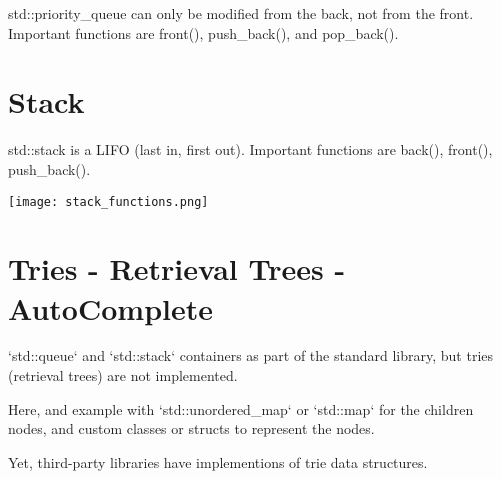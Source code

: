 \documentclass[openany]{report}
\begin{document}
std::priority\_queue can only be modified from the back, not from the front. Important functions are front(), push\_back(), 
and pop\_back().

\section{Stack}

std::stack is a LIFO (last in, first out). Important functions are back(), front(), push\_back().

\begin{center}
    \texttt{[image: stack\_functions.png]}
\end{center}

\section{Tries - Retrieval Trees - AutoComplete}

`std::queue` and `std::stack` containers as part of the standard library, but tries (retrieval trees) are not implemented. 

Here, and example with `std::unordered\_map` or `std::map` for the children nodes,
and custom classes or structs to represent the nodes.

Yet, third-party libraries have implementions of trie data structures.
\end{document}
